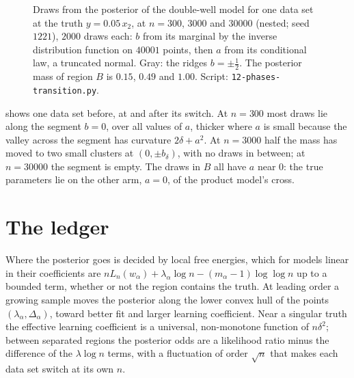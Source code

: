 \begin{refsection}
\begin{figure}[t]
\centering
{}
\caption{Draws from the posterior of the double-well model for one data set at the truth $y=0.05\,x_2$, at $n=300$, $3000$ and $30000$ (nested; seed $1221$), $2000$ draws each: $b$ from its marginal by the inverse distribution function on $40001$ points, then $a$ from its conditional law, a truncated normal. Gray: the ridges $b=\pm\frac12$. The posterior mass of region $B$ is $0.15$, $0.49$ and $1.00$. Script: \texttt{12-phases-transition.py}.}\label{fig:phases:draws}
\end{figure}

 shows one data set before, at and after its switch. At $n=300$ most draws lie along the segment $b=0$, over all values of $a$, thicker where $a$ is small because the valley across the segment has curvature $2\delta+a^2$. At $n=3000$ half the mass has moved to two small clusters at $(0,\pm b_\delta)$, with no draws in between; at $n=30000$ the segment is empty. The draws in $B$ all have $a$ near $0$: the true parameters lie on the other arm, $a=0$, of the product model's cross.

\section{The ledger}\label{sec:phases:ledger}

Where the posterior goes is decided by local free energies, which for models linear in their coefficients are $nL_n(w_\alpha)+\lambda_\alpha\log n-(m_\alpha-1)\log\log n$ up to a bounded term, whether or not the region contains the truth. At leading order a growing sample moves the posterior along the lower convex hull of the points $(\lambda_\alpha,\Delta_\alpha)$, toward better fit and larger learning coefficient. Near a singular truth the effective learning coefficient is a universal, non-monotone function of $n\delta^2$; between separated regions the posterior odds are a likelihood ratio minus the difference of the $\lambda\log n$ terms, with a fluctuation of order $\sqrt n$ that makes each data set switch at its own $n$.


\end{refsection}
